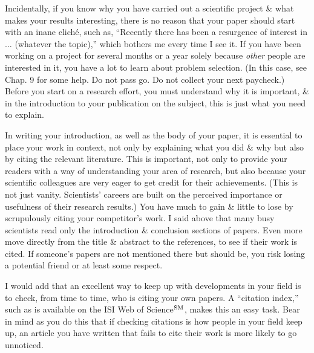 \documentclass{article}
\begin{document}
\begin{enumerate}
\begin{itemize}
\begin{itemize}
			Incidentally, if you know why you have carried out a scientific project \& what makes your results interesting, there is no reason that your paper should start with an inane clich\'e, such as, ``Recently there has been a resurgence of interest in $\ldots$ (whatever the topic),'' which bothers me every time I see it. If you have been working on a project for several months or a year solely because \textit{other} people are interested in it, you have a lot to learn about problem selection. (In this case, see Chap. 9 for some help. Do not pass go. Do not collect your next paycheck.) Before you start on a research effort, you must understand why it is important, \& in the introduction to your publication on the subject, this is just what you need to explain.
			
			In writing your introduction, as well as the body of your paper, it is essential to place your work in context, not only by explaining what you did \& why but also by citing the relevant literature. This is important, not only to provide your readers with a way of understanding your area of research, but also because your scientific colleagues are very eager to get credit for their achievements. (This is not just vanity. Scientists' careers are built on the perceived importance or usefulness of their research results.) You have much to gain \& little to lose by scrupulously citing your competitor's work. I said above that many busy scientists read only the introduction \& conclusion sections of papers. Even more move directly from the title \& abstract to the references, to see if their work is cited. If someone's papers are not mentioned there but should be, you risk losing a potential friend or at least some respect.
			
			I would add that an excellent way to keep up with developments in your field is to check, from time to time, who is citing your own papers. A ``citation index,'' such as is available on the ISI Web of Science${}^{\rm SM}$, makes this an easy task. Bear in mind as you do this that if checking citations is how people in your field keep up, an article you have written that fails to cite their work is more likely to go unnoticed.
			

\end{itemize}
\end{itemize}
\end{enumerate}
\end{document}
